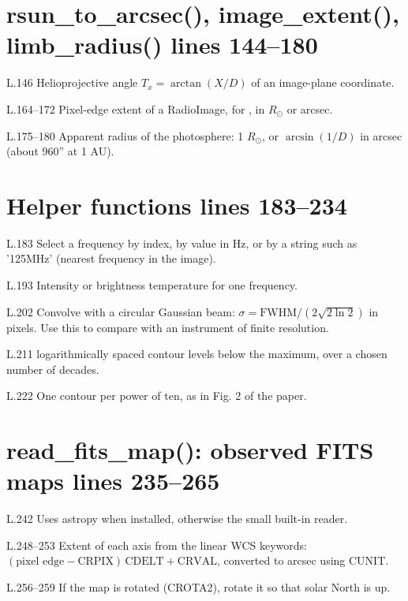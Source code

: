 \section*{\normalsize rsun\_to\_arcsec(), image\_extent(), limb\_radius() \hfill{\small\mdseries\color{gray}lines 144--180}}

\begin{lines}
\item[L.146] Helioprojective angle $T_x=\arctan(X/D)$ of an image-plane coordinate.
\item[L.164–172] Pixel-edge extent of a RadioImage, for , in $R_\odot$ or arcsec.
\item[L.175–180] Apparent radius of the photosphere: 1 $R_\odot$, or $\arcsin(1/D)$ in arcsec (about 960'' at 1 AU).
\end{lines}
\section*{\normalsize Helper functions \hfill{\small\mdseries\color{gray}lines 183--234}}

\begin{lines}
\item[L.183] Select a frequency by index, by value in Hz, or by a string such as '125MHz' (nearest frequency in the image).
\item[L.193] Intensity or brightness temperature for one frequency.
\item[L.202] Convolve with a circular Gaussian beam: $\sigma=\text{FWHM}/(2\sqrt{2\ln2})$ in pixels. Use this to compare with an instrument of finite resolution.
\item[L.211]  logarithmically spaced contour levels below the maximum, over a chosen number of decades.
\item[L.222] One contour per power of ten, as in Fig. 2 of the paper.
\end{lines}
\section*{\normalsize read\_fits\_map(): observed FITS maps \hfill{\small\mdseries\color{gray}lines 235--265}}

\begin{lines}
\item[L.242] Uses astropy when installed, otherwise the small built-in reader.
\item[L.248–253] Extent of each axis from the linear WCS keywords: $(\text{pixel edge}-\text{CRPIX})\,\text{CDELT}+\text{CRVAL}$, converted to arcsec using CUNIT.
\item[L.256–259] If the map is rotated (CROTA2), rotate it so that solar North is up.
\end{lines}
